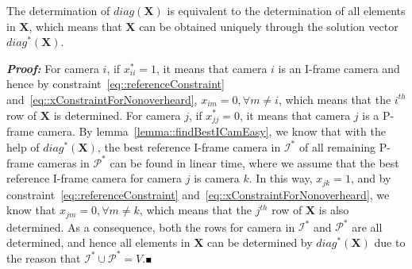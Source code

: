 \begin{mythm}
The determination of $diag(\mathbf{X})$ is equivalent to the determination of all elements in $\mathbf{X}$, which means that $\mathbf{X}$ can be obtained uniquely through the solution vector $diag^*(\mathbf{X})$.
\label{theorem::determineX}
\end{mythm}
\textbf{\emph{Proof:}}
For camera $i$, if $x_{ii}^* =1$, it means that camera $i$ is an I-frame camera and hence by constraint~\eqref{eq::referenceConstraint} and~\eqref{eq::xConstraintForNonoverheard}, $x_{im}=0, \forall m \neq i$, which means that the $i^{th}$ row of $\mathbf{X}$ is determined.
For camera $j$, if $x_{jj}^* =0$, it means that camera $j$ is a P-frame camera.
By lemma~\ref{lemma::findBestICamEasy}, we know that with the help of $diag^*(\mathbf{X})$, the best reference I-frame camera in $\mathcal{I}^*$ of all remaining P-frame cameras in $\mathcal{P}^*$ can be found in linear time, where we assume that the best reference I-frame camera for camera $j$ is camera $k$.
In this way, $x_{jk}=1$, and by constraint~\eqref{eq::referenceConstraint} and~\eqref{eq::xConstraintForNonoverheard}, we know that $x_{jm}=0, \forall m \neq k$, which means that the $j^{th}$ row of $\mathbf{X}$ is also determined.
As a consequence, both the rows for camera in $\mathcal{I}^*$ and $\mathcal{P}^*$ are all determined, and hence all elements in $\mathbf{X}$ can be determined by $diag^*(\mathbf{X})$ due to the reason that $\mathcal{I}^* \cup \mathcal{P}^* = V$.\hfill$\mathsmaller{\mathsmaller{\blacksquare}}$

